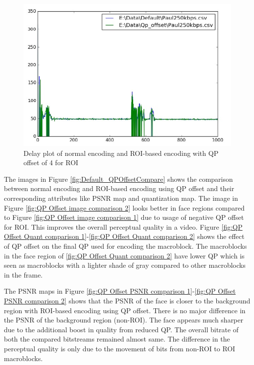 \documentclass[11pt]{article} %
\begin{document}
\begin{figure}[!h]
    \centering
    \includegraphics[scale=0.75]{QPOffset/Paul250kbps_QP_Offset_Delay}
    \caption{Delay plot of normal encoding and ROI-based encoding with QP offset of 4 for ROI}
    \label{fig:DelayDefault_QPOffsetCompare}
\end{figure}

The images in Figure \ref{fig:Default_QPOffsetCompare} shows the comparison between normal encoding and ROI-based encoding using QP offset and their corresponding attributes like PSNR map and  quantization map. The image in Figure \ref{fig:QP Offset image comparison 2} looks better in face regions compared to Figure \ref{fig:QP Offset image comparison 1} due to usage of negative QP offset for ROI. This improves the overall perceptual quality in a video. Figure \ref{fig:QP Offset Quant comparison 1}-\ref{fig:QP Offset Quant comparison 2} shows the effect of QP offset on the final QP used for encoding the macroblock. The macroblocks in the face region of \ref{fig:QP Offset Quant comparison 2} have lower QP which is seen as  macroblocks with a lighter shade of gray compared to other macroblocks in the frame. 

 The PSNR maps in Figure \ref{fig:QP Offset PSNR comparison 1}-\ref{fig:QP Offset PSNR comparison 2} shows that the PSNR of the face is closer to the background region with ROI-based encoding using QP offset. There is no major difference in the PSNR of the background region (non-ROI). The face appears much sharper due to the additional boost in quality from reduced QP. The overall bitrate of both the compared bitstreams remained almost same. The difference in the perceptual quality is only due to the movement of bits from non-ROI to ROI macroblocks. 
 
\end{document}
